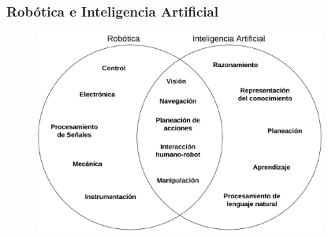 \documentclass[10pt,spanish,aspectratio=1610]{beamer}
\begin{document}
\begin{frame}\frametitle{Robótica e Inteligencia Artificial}
  \begin{figure}
    \centering
    \includegraphics[width=0.85\textwidth]{Figures/RoboticsVsAI.pdf}
    \end{figure}
\end{frame}
\end{document}
